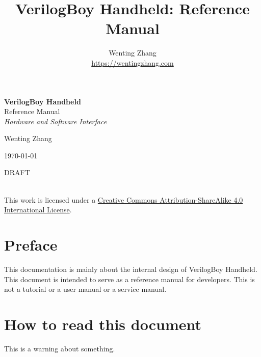 \documentclass[a4paper, draft, oneside]{memoir}
\title{VerilogBoy Handheld: Reference Manual}
\author{Wenting Zhang\\ \url{https://wentingzhang.com}}
\begin{document}
\hypersetup{pageanchor=false}

\begin{titlingpage}
	\vspace*{\baselineskip} %
	\vspace*{0.167\textheight} %
	{\textbf{\LARGE VerilogBoy Handheld}}\\[\baselineskip] %
	{\Huge Reference Manual}\\[\baselineskip] %
  {\Large \textit{Hardware and Software Interface}} %
  \vspace*{0.167\textheight}\par
  {\Large Wenting Zhang\par} %
  {\large \today\par}
	\vfill %
  \ifdraftdoc
    DRAFT\par
  \fi
  \href{http://creativecommons.org/licenses/by-sa/4.0/}{\Huge \ccbysa}\\
  This work is licensed under a \href{http://creativecommons.org/licenses/by-sa/4.0/}{Creative Commons Attribution-ShareAlike 4.0 International License}.
  \vspace*{3\baselineskip} %
\end{titlingpage}

\hypersetup{pageanchor=true}

\chapter*{Preface}

This documentation is mainly about the internal design of VerilogBoy Handheld. This document is intended to serve as a reference manual for developers. This is not a tutorial or a user manual or a service manual.

\chapter*{How to read this document}

\begin{warning}
  This is a warning about something.
\end{warning}
\end{document}
